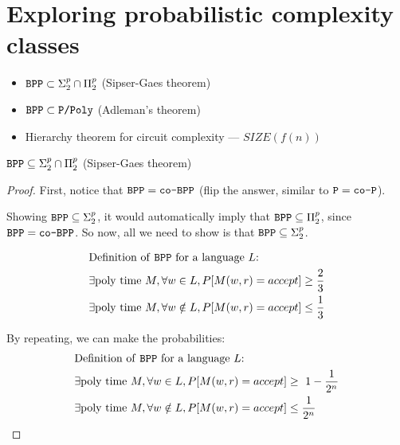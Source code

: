 \newcommand{\cobpp}{\texttt{co-BPP}}
\newcommand{\ip}{\texttt{IP}}
\newcommand{\zkp}{\texttt{ZKP}}
\chapter{Exploring probabilistic complexity classes}

\begin{itemize}
    \item $\texttt{BPP} \subset \Sigma^p_2 \cap \Pi^p_2$ (Sipser-Gaes theorem)
    \item $\texttt{BPP} \subset \texttt{P/Poly}$ (Adleman's theorem)
    \item Hierarchy theorem for circuit complexity --- $SIZE(f(n))$
\end{itemize}


\begin{theorem}
    $\texttt{BPP} \subseteq \Sigma^p_2 \cap \Pi^p_2$ (Sipser-Gaes theorem)
\end{theorem}
\begin{proof}
    First, notice that $\bpp = \cobpp$ (flip the answer, similar to $\texttt{P} = \texttt{co-P}$).

    Showing $\texttt{BPP} \subseteq \Sigma_2^p$, it would automatically imply that $\texttt{BPP} \subseteq \Pi_2^p$,
    since $\bpp = \cobpp$.
    So now, all we need to show is that $\texttt{BPP} \subseteq \Sigma_2^p$.

    \begin{align*}
    &\text{Definition of \texttt{BPP}~for a language $L$:} \\
    &\exists \text{poly time}~M, \forall w \in L, P[M(w, r) = accept] \geq \frac{2}{3} \\
    &\exists \text{poly time}~M, \forall w \notin L, P[M(w, r) = accept] \leq \frac{1}{3}
    \end{align*}

    By repeating, we can make the probabilities:
    \begin{align*}
    &\text{Definition of \texttt{BPP}~for a language $L$:} \\
    &\exists \text{poly time}~M, \forall w \in L, P[M(w, r) = accept] \geq \ 1 - \frac{1}{2^n} \\
    &\exists \text{poly time}~M, \forall w \notin L, P[M(w, r) = accept] \leq \frac{1}{2^n}
    \end{align*}
\end{proof}


